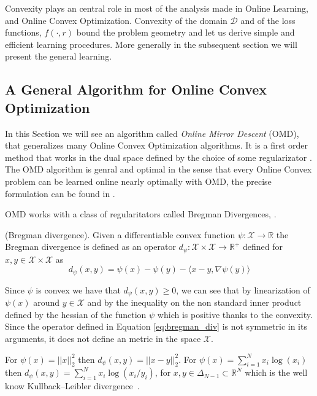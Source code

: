 Convexity plays an central role in most of the analysis made in Online Learning, and Online Convex Optimization. Convexity of the domain $\mathcal D$ and of the loss functions, $f(\cdot,r)$ bound the problem geometry and let us derive simple and efficient learning procedures. More generally in the subsequent section we will present the general learning.

\subsection{A General Algorithm for Online Convex Optimization}

In this Section we will see an algorithm called \emph{Online Mirror Descent} (OMD), that generalizes many Online Convex Optimization algorithms. It is a first order method that works in the dual space defined by the choice of some regularizator . The OMD algorithm is genral and optimal in the sense that every Online Convex problem can be learned online nearly optimally with OMD, the precise formulation can be found in \cite{srebro2011universality}.

OMD works with a class of regularitators called Bregman Divergences, \cite{banerjee2005clustering}.

\begin{definition}(Bregman divergence). Given a differentiable convex function $\psi:\mathcal X\to\mathbb R$ the Bregman divergence is defined as an operator $d_{\psi}:\mathcal X\times\mathcal X\to \mathbb R^+$ defined for $x,y\in\mathcal X\times\mathcal X$ as 
\begin{equation}\label{eq:bregman_div}
d_\psi(x,y)=\psi(x)-\psi(y)-\langle x-y,\nabla \psi(y)\rangle
\end{equation}
\end{definition}

Since $\psi$ is convex we have that $d_\psi(x,y)\ge0$, we can see that by linearization of $\psi(x)$ around $y\in\mathcal X$ and by the inequality on the non standard inner product defined by the hessian of the function $\psi$ which is positive thanks to the convexity. Since the operator defined in Equation \eqref{eq:bregman_div} is not symmetric in its arguments, it does not define an metric in the space $\mathcal X$.

For $\psi(x)=||x||_2^2$ then $d_\psi(x,y)=||x-y||_2^2$. For $\psi(x)=\sum\limits_{i=1}^Nx_i\log(x_i)$ then $d_\psi(x,y)=\sum\limits_{i=1}^Nx_i\log(x_i/y_i)$, for $x,y\in\Delta_{N-1}\subset \mathbb R^N$ which is the well know Kullback–Leibler divergence~\cite{van2014renyi}.

